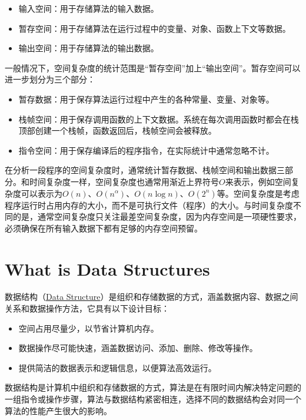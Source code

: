 \begin{itemize}
    \item 输入空间：用于存储算法的输入数据。
    \item 暂存空间：用于存储算法在运行过程中的变量、对象、函数上下文等数据。
    \item 输出空间：用于存储算法的输出数据。
\end{itemize}

一般情况下，空间复杂度的统计范围是“暂存空间”加上“输出空间”。暂存空间可以进一步划分为三个部分：

\begin{itemize}
    \item 暂存数据：用于保存算法运行过程中产生的各种常量、变量、对象等。
    \item 栈帧空间：用于保存调用函数的上下文数据。系统在每次调用函数时都会在栈顶部创建一个栈帧，函数返回后，栈帧空间会被释放。
    \item 指令空间：用于保存编译后的程序指令，在实际统计中通常忽略不计。
\end{itemize}

在分析一段程序的空间复杂度时，通常统计暂存数据、栈帧空间和输出数据三部分。和时间复杂度一样，空间复杂度也通常用渐近上界符号$O$来表示，例如空间复杂度可以表示为$O(n)$、$O(n^{\alpha})$、$O(n \log n)$、$O(2^n)$等。空间复杂度是考虑程序运行时占用内存的大小，而不是可执行文件（程序）的大小。与时间复杂度不同的是，通常空间复杂度只关注最差空间复杂度，因为内存空间是一项硬性要求，必须确保在所有输入数据下都有足够的内存空间预留。

\section{What is Data Structures}
数据结构（\href{https://www.wikiwand.com/en/articles/Data_structure}{Data Structure}）是组织和存储数据的方式，涵盖数据内容、数据之间关系和数据操作方法，它具有以下设计目标：

\begin{itemize}
    \item 空间占用尽量少，以节省计算机内存。
    \item 数据操作尽可能快速，涵盖数据访问、添加、删除、修改等操作。
    \item 提供简洁的数据表示和逻辑信息，以便算法高效运行。
\end{itemize}

数据结构是计算机中组织和存储数据的方式，算法是在有限时间内解决特定问题的一组指令或操作步骤，算法与数据结构紧密相连，选择不同的数据结构会对同一个算法的性能产生很大的影响。

